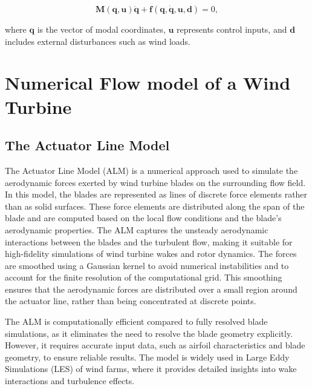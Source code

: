 \begin{equation}
    \mathbf{M}(\mathbf{q}, \mathbf{u}) \ddot{\mathbf{q}} + \mathbf{f}(\mathbf{q}, \dot{\mathbf{q}}, \mathbf{u}, \mathbf{d}) = 0, \label{eq:general_eom}
\end{equation}

where $\mathbf{q}$ is the vector of modal coordinates, $\mathbf{u}$ represents control inputs, and $\mathbf{d}$ includes external disturbances such as wind loads.

\section{Numerical Flow model of a Wind Turbine}
\subsection{The Actuator Line Model} 

The Actuator Line Model (ALM) is a numerical approach used to simulate the aerodynamic forces exerted by wind turbine blades on the surrounding flow field. In this model, the blades are represented as lines of discrete force elements rather than as solid surfaces. These force elements are distributed along the span of the blade and are computed based on the local flow conditions and the blade's aerodynamic properties. The ALM captures the unsteady aerodynamic interactions between the blades and the turbulent flow, making it suitable for high-fidelity simulations of wind turbine wakes and rotor dynamics. The forces are smoothed using a Gaussian kernel to avoid numerical instabilities and to account for the finite resolution of the computational grid. This smoothing ensures that the aerodynamic forces are distributed over a small region around the actuator line, rather than being concentrated at discrete points.

The ALM is computationally efficient compared to fully resolved blade simulations, as it eliminates the need to resolve the blade geometry explicitly. However, it requires accurate input data, such as airfoil characteristics and blade geometry, to ensure reliable results. The model is widely used in Large Eddy Simulations (LES) of wind farms, where it provides detailed insights into wake interactions and turbulence effects.
